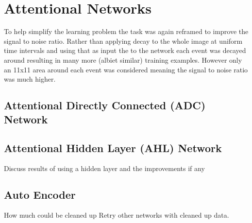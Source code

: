 \chapter{Attentional Networks}
\label{ch:attentional}
To help simplify the learning problem the task was again reframed to improve the signal to noise ratio.
Rather than applying decay to the whole image at uniform time intervals and using that as input the to the network each event was decayed around resulting in many more (albiet similar) training examples.
However only an 11x11 area around each event was considered meaning the signal to noise ratio was much higher. 

\section{Attentional Directly Connected (ADC) Network}



\section{Attentional Hidden Layer (AHL) Network}

Discuss results of using a hidden layer and the improvements if any


\section{Auto Encoder}
How much could be cleaned up
Retry other networks with cleaned up data.

